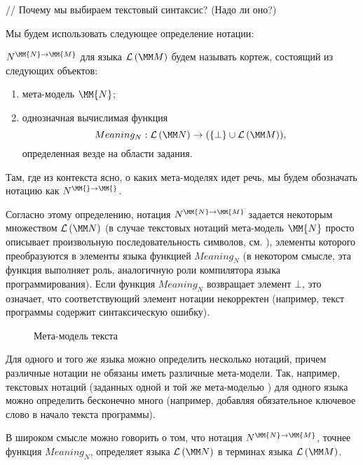 {// Почему мы выбираем текстовый синтаксис? (Надо ли оно?)

Мы будем использовать следующее определение нотации:

\newcommand{\NNot}[3]{#1^{{#2} \rightarrow{} {#3}}}
\newcommand{\Not}[3]{\NNot{#1}{\MM{#2}}{\MM{#3}}}
\newcommand{\N}[2]{\Not{#1}{#1}{#2}}

\begin{Def}
 $\N{N}{M}$ для языка $\LMM{M}$ будем называть кортеж, состоящий из следующих объектов:
\begin{enumerate}
\item мета-модель $\MM{N}$;
\item однозначная вычислимая функция $$Meaning_N : \LMM{N} \rightarrow (\{\bot\} \cup \LMM{M}),$$ определенная везде на области задания.
\end{enumerate}

Там, где из контекста ясно, о каких мета-моделях идет речь, мы будем обозначать нотацию как $\Not{N}{}{}$.
\end{Def}

Согласно этому определению, нотация $\N{N}{M}$ задается некоторым множеством $\LMM{N}$ (в случае текстовых нотаций мета-модель $\MM{N}$ просто описывает произвольную последовательность символов, см. ), элементы которого преобразуются в элементы языка функцией $Meaning_N$ (в некотором смысле, эта функция выполняет роль, аналогичную роли компилятора языка программирования). Если функция $Meaning_N$ возвращает элемент $\bot$, это означает, что соответствующий элемент нотации некорректен (например, текст программы содержит синтаксическую ошибку).

\begin{figure}[htbp]
\caption{Мета-модель текста}\label{TextMM}
\end{figure}

Для одного и того же языка можно определить несколько нотаций, причем различные нотации не обязаны иметь различные мета-модели. Так, например, текстовых нотаций (заданных одной и той же мета-моделью ) для одного языка можно определить бесконечно много (например, добавляя обязательное ключевое слово в начало текста программы).

В широком смысле можно говорить о том, что нотация $\N{N}{M}$, точнее функция $Meaning_N$, определяет  \cite{???} языка $\LMM{N}$ в терминах языка $\LMM{M}$.

}
